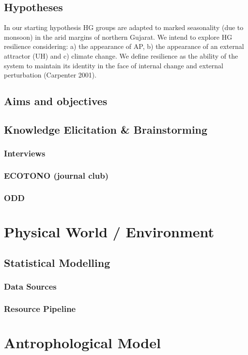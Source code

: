 \documentclass{report}
\begin{document}
\begin{enumeration}
\begin{end}
	    \subsection{Hypotheses}
In our starting hypothesis HG groups are adapted to marked seasonality (due to monsoon) in the arid margins of northern Gujarat. We intend to explore HG resilience considering: a) the appearance of AP, b) the appearance of an external attractor (UH) and c) climate change. We define resilience as the ability of the system to maintain its identity in the face of internal change and external perturbation (Carpenter 2001).
	    \subsection{Aims and objectives}
	    \subsection{Knowledge Elicitation \& Brainstorming}
		\subsubsection{Interviews}
		\subsubsection{ECOTONO (journal club)}
		\subsubsection{ODD}

	\section{Physical World / Environment}		%
		\subsection{Statistical Modelling}
			\subsubsection{Data Sources}
			\subsubsection{Resource Pipeline}

	\section{Antrophological Model}				%

\end{end}
\end{enumeration}
\end{document}
